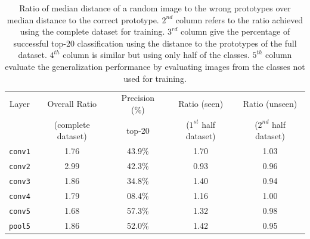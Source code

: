 \begin{table}[htb]
\centering
\small
\begin{tabular}{|c|c|c||c|c|}
  \hline
  Layer & Overall Ratio & Precision (\%) & Ratio (seen)  & Ratio (unseen) \\
  & (complete dataset) & top-20 & ($1^{st}$ half dataset) & ($2^{nd}$ half dataset) \\
  \hline
  {\tt conv1} & 1.76 & 43.9\% & 1.70 & 1.03 \\ 
  {\tt conv2} & 2.99 & 42.3\% & 0.93 & 0.96 \\ 
  {\tt conv3} & 1.86 & 34.8\% & 1.40 & 0.94 \\ 
  {\tt conv4} & 1.79 & 08.4\% & 1.16 & 1.00 \\ 
  {\tt conv5} & 1.68 & 57.3\% & 1.32 & 0.98 \\ 
  {\tt pool5} & 1.86 & 52.0\% & 1.42 & 0.95 \\ 
  \hline
\end{tabular}
\caption{Ratio of median distance of a random image to the wrong prototypes over median distance to the correct prototype. $2^{nd}$ column refers to the ratio achieved using the complete dataset for training. $3^{rd}$ column give the percentage of successful top-20 classification using the distance to the prototypes of the full dataset. $4^{th}$ column is similar but using only half of the classes. $5^{th}$ column evaluate the generalization performance by evaluating images from the classes not used for training. }
\label{fulltrainvalues}
\end{table}

